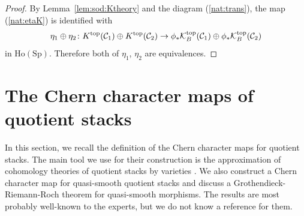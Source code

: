 \documentclass [11pt,oneside,a4paper,mathscr]{amsart}
\theoremstyle{definition}
\begin{document}
\begin{proof}
	By Lemma~\ref{lem:sod:Ktheory} and the diagram (\ref{nat:trans}), 
 the map (\ref{nat:etaK}) is identified with 
	\begin{align*}
		\eta_1 \oplus \eta_2 
		\colon K^{\rm{top}}(\mathcal{C}_1)\oplus
		K^{\rm{top}}(\mathcal{C}_2)
		\to \phi_{\ast}\mathcal{K}_B^{\rm{top}}(\mathcal{C}_1) \oplus
		\phi_{\ast}\mathcal{K}_B^{\rm{top}}(\mathcal{C}_2)
	\end{align*}
    in $\mathrm{Ho}(\mathrm{Sp})$.
	Therefore both of $\eta_1$, $\eta_2$ are equivalences. 
\end{proof}


    
    
    
    
    
    
    
    
    
    
    
    
    
    
    
    
    
    
    
    
    
    
    
    
    
    
    
    
    
    
    
    
    
    
    
    
    
    
    
    
    
    
    
    
    
    
    
    
    
    
    
    
    
    
    
    
    
    
    
    
    
    
  
\section{The Chern character maps of quotient stacks}\label{s3}


In this section, we recall the definition of the Chern character maps for quotient stacks. The main tool we use for their construction is the approximation of cohomology theories of quotient stacks by varieties \cite{Totaro, EdidinGraham}. We also construct a Chern character map for quasi-smooth quotient stacks and discuss a Grothendieck-Riemann-Roch theorem for quasi-smooth morphisms. The results are most probably well-known to the experts, but we do not know a reference for them. 
\end{document}
